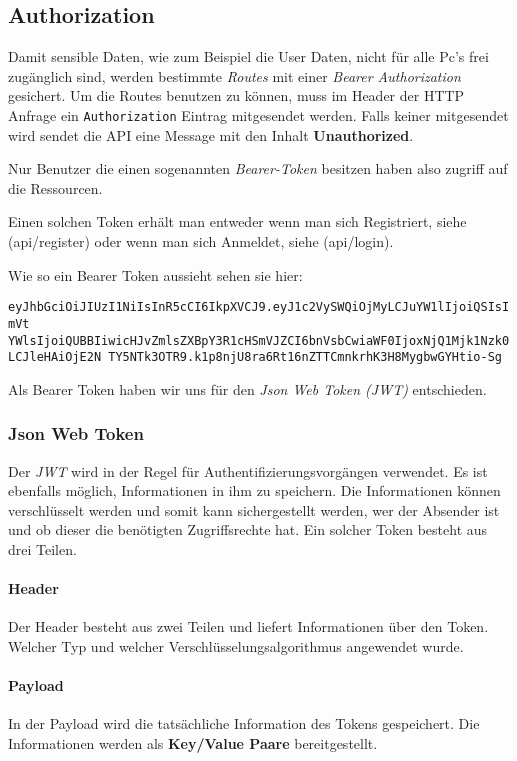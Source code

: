 \subsection{Authorization}

Damit sensible Daten, wie zum Beispiel die User Daten, nicht für
alle Pc's frei zugänglich sind, werden bestimmte \textit{Routes} mit einer
\textit{Bearer Authorization} gesichert. Um die Routes benutzen zu können, muss
im Header der HTTP Anfrage ein \texttt{Authorization} Eintrag mitgesendet werden.
Falls keiner mitgesendet wird sendet die API eine Message mit den Inhalt
\textbf{Unauthorized}.

Nur Benutzer die einen sogenannten \textit{Bearer-Token} besitzen haben also zugriff
auf die Ressourcen.

Einen solchen Token erhält man entweder wenn man sich Registriert, siehe (api/register) oder wenn man sich
Anmeldet, siehe (api/login).

Wie so ein Bearer Token aussieht sehen sie hier:

\texttt{eyJhbGciOiJIUzI1NiIsInR5cCI6IkpXVCJ9.eyJ1c2VySWQiOjMyLCJuYW1lIjoiQSIsImVt
    YWlsIjoiQUBBIiwicHJvZmlsZXBpY3R1cHSmVJZCI6bnVsbCwiaWF0IjoxNjQ1Mjk1Nzk0LCJleHAiOjE2N
    TY5NTk3OTR9.k1p8njU8ra6Rt16nZTTCmnkrhK3H8MygbwGYHtio-Sg}

Als Bearer Token haben wir uns für den \textit{Json Web Token (JWT)} entschieden.

\pagebreak

\subsubsection{Json Web Token}
\label{token}
Der \textit{JWT} wird in der Regel für Authentifizierungsvorgängen verwendet. Es ist ebenfalls
möglich, Informationen in ihm zu speichern. Die Informationen können verschlüsselt werden
und somit kann sichergestellt werden, wer der Absender ist und ob dieser die benötigten Zugriffsrechte
hat. Ein solcher Token besteht aus drei Teilen.

\paragraph{Header}
Der Header besteht aus zwei Teilen und liefert Informationen über den Token. Welcher Typ und
welcher Verschlüsselungsalgorithmus angewendet wurde.

\paragraph{Payload}
In der Payload wird die tatsächliche Information des Tokens gespeichert. Die Informationen
werden als \textbf{Key/Value Paare} bereitgestellt.

